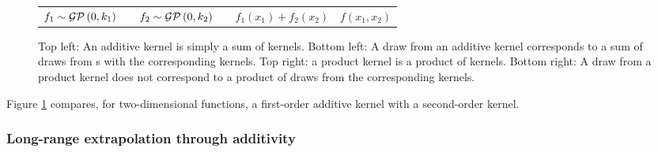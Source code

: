 \begin{figure}
\begin{tabular}{ccccc|c}
$f_1 \sim \mathcal{GP}\left(0, k_1\right)$ & & $f_2 \sim \mathcal{GP}\left(0, k_2\right)$ & & $f_1(x_1) + f_2(x_2)$ & $f(x_1, x_2)$ \\
\end{tabular}
\caption[Additive kernels correspond to additive functions]{Top left: An additive kernel is simply a sum of kernels.  Bottom left:  A draw from an additive kernel corresponds to a sum of draws from \gp{}s with the corresponding kernels.  Top right: a product kernel is a product of kernels.  Bottom right:  A draw from a product kernel does not correspond to a product of draws from the corresponding kernels.
}
\label{fig:kernels}
\end{figure}

Figure \ref{fig:kernels} compares, for two-dimensional functions, a first-order additive kernel with a second-order kernel.



\subsubsection{Long-range extrapolation through additivity}

